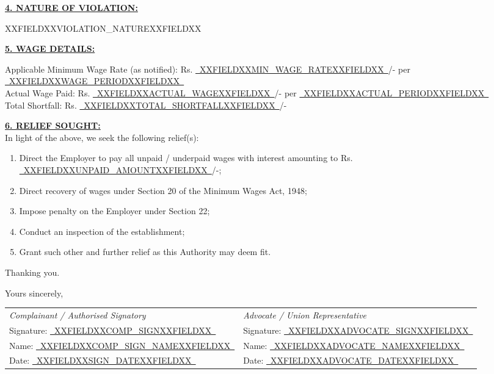 \documentclass[12pt,a4paper]{article}
\newcommand{\fillline}[1]{\underline{~#1~}}
\begin{document}
\vspace{1em}

\noindent\textbf{\uline{4. NATURE OF VIOLATION:}}

\vspace{0.3em}
\noindent XXFIELDXXVIOLATION_NATUREXXFIELDXX

\vspace{1em}

\noindent\textbf{\uline{5. WAGE DETAILS:}}

\vspace{0.3em}
\noindent Applicable Minimum Wage Rate (as notified): Rs. \fillline{XXFIELDXXMIN_WAGE_RATEXXFIELDXX}/-
per \fillline{XXFIELDXXWAGE_PERIODXXFIELDXX}\\
Actual Wage Paid: Rs. \fillline{XXFIELDXXACTUAL_WAGEXXFIELDXX}/- per \fillline{XXFIELDXXACTUAL_PERIODXXFIELDXX}\\
Total Shortfall: Rs. \fillline{XXFIELDXXTOTAL_SHORTFALLXXFIELDXX}/-

\vspace{1em}

\noindent\textbf{\uline{6. RELIEF SOUGHT:}}\\
In light of the above, we seek the following relief(s):

\begin{enumerate}[label=(\alph*)]
    \item Direct the Employer to pay all unpaid / underpaid wages with interest
          amounting to Rs. \fillline{XXFIELDXXUNPAID_AMOUNTXXFIELDXX}/-;
    \item Direct recovery of wages under Section 20 of the Minimum Wages Act, 1948;
    \item Impose penalty on the Employer under Section 22;
    \item Conduct an inspection of the establishment;
    \item Grant such other and further relief as this Authority may deem fit.
\end{enumerate}

\vspace{1.5em}

\noindent Thanking you.

\vspace{0.5em}

\noindent Yours sincerely,

\vspace{2em}

\noindent
\begin{tabularx}{\textwidth}{@{}X X@{}}
    \textit{Complainant / Authorised Signatory} &
    \textit{Advocate / Union Representative}\\[1.5em]
    Signature: \fillline{XXFIELDXXCOMP_SIGNXXFIELDXX} & Signature: \fillline{XXFIELDXXADVOCATE_SIGNXXFIELDXX}\\[0.5em]
    Name: \fillline{XXFIELDXXCOMP_SIGN_NAMEXXFIELDXX} & Name: \fillline{XXFIELDXXADVOCATE_NAMEXXFIELDXX}\\[0.5em]
    Date: \fillline{XXFIELDXXSIGN_DATEXXFIELDXX} & Date: \fillline{XXFIELDXXADVOCATE_DATEXXFIELDXX}\\
\end{tabularx}
\end{document}
